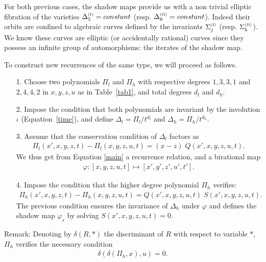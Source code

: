 \documentclass[reqno]{amsart}
\numberwithin{equation}{section}
\numberwithin{figure}{section}
\begin{document}
For both previous cases, the shadow maps provide us with a non trivial
elliptic fibration of the varieties $\Delta_5^{\scriptscriptstyle(\rm
  I)} = constant$ (resp.  $\Delta_8^{\scriptscriptstyle(\rm II)} =
constant$). Indeed their orbits are confined to algebraic curves
defined by the invariants $\Sigma_j^{\scriptscriptstyle(\rm I)}$
(resp.  $\Sigma_k^{\scriptscriptstyle(\rm II)}$). We know these curves
are elliptic (or accidentally rational) curves since they possess an
infinite group of automorphisms: the iterates of the shadow map.

To construct new recurrences of the same type, we will proceed as follows.
\begin{enumerate}
\item[1.] Choose two polynomials $\Pi_l$ and $\Pi_h$ with respective
  degrees $1,3,3,1$ and $2,4,4,2$ in $x,y,z,u$ as in
  Table~\ref{tab1}, and total  degrees   $d_l$ and $d_h$.
\item[2.] Impose the condition that both polynomials are invariant
    by the involution $\iota$ (Equation~\eqref{time}), and define $\Delta_l =
    \Pi_l/t^{d_l}$ and $\Delta_h=\Pi_h/t^{d_h}$.
\item[3.] Assume that the conservation condition of $\Delta_l $  factors as
\begin{eqnarray}
\label{main}
\Pi_l( x',x,y,z,t) - \Pi_l(x,y,z,u,t) = ( x-z ) \; Q( x', x, y, z, u, t).
\end{eqnarray}
We thus get from Equation \eqref{main} a recurrence relation, and a
birational map
\begin{eqnarray}
\varphi: [x,y,z,u,t] \mapsto  [x',y',z',u',t'].
\end{eqnarray}
\item[4.]  Impose the condition that the higher degree polynomial
  $\Pi_h$ verifies:
\begin{eqnarray}
  \Pi_h( x',x,y,z,t) - \Pi_h(x,y,z,u,t) = Q( x', x, y, z, u, t) \; S( x',
  x, y, z, u, t).
\end{eqnarray}
The previous condition ensures the invariance of
$\Delta_h$ under $\varphi$ and defines the shadow map
$\varphi_s$ by solving $S( x', x, y, z, u, t)=0$.
\end{enumerate}

Remark: Denoting by $\delta(R,*)$ the discriminant of $R$ with respect to variable $*$,
$\Pi_h$ verifies the necessary condition
\begin{eqnarray}
\delta( \delta ( \Pi_h, x) , u ) =0.
\end{eqnarray}
\end{document}
